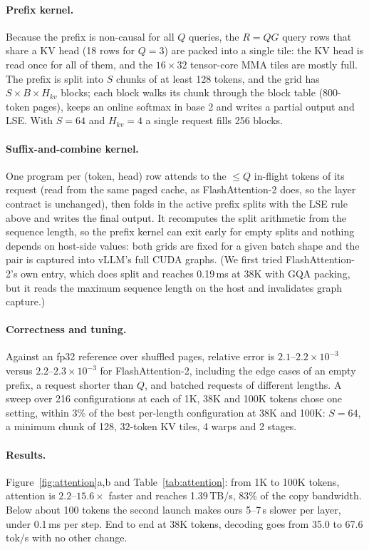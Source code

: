 \documentclass[acmtog,nonacm,screen]{acmart}
\newcommand{\tps}{\,tok/s\xspace}
\newcommand{\us}{\,\textmu{}s\xspace}
\newcommand{\ms}{\,ms\xspace}
\begin{document}
\paragraph{Prefix kernel.} Because the prefix is non-causal for all $Q$ queries, the $R{=}QG$ query rows that share a
KV head (18 rows for $Q{=}3$) are packed into a single tile: the KV head is read once for all of them, and the
$16 \times 32$ tensor-core MMA tiles are mostly full. The prefix is split into $S$ chunks of at least 128 tokens, and
the grid has $S \times B \times H_{kv}$ blocks; each block walks its chunk through the block table (800-token pages),
keeps an online softmax in base 2 and writes a partial output and LSE. With $S{=}64$ and $H_{kv}{=}4$ a single
request fills 256 blocks.

\paragraph{Suffix-and-combine kernel.} One program per (token, head) row attends to the $\le Q$ in-flight tokens of
its request (read from the same paged cache, as FlashAttention-2 does, so the layer contract is unchanged), then folds
in the active prefix splits with the LSE rule above and writes the final output. It recomputes the split arithmetic
from the sequence length, so the prefix kernel can exit early for empty splits and nothing depends on host-side
values: both grids are fixed for a given batch shape and the pair is captured into vLLM's full CUDA graphs. (We first
tried FlashAttention-2's own  entry, which does split and reaches 0.19\ms at 38K with GQA packing,
but it reads the maximum sequence length on the host and invalidates graph capture.)

\paragraph{Correctness and tuning.} Against an fp32 reference over shuffled pages, relative error is
$2.1$--$2.2\times10^{-3}$ versus $2.2$--$2.3\times10^{-3}$ for FlashAttention-2, including the edge cases of an empty
prefix, a request shorter than $Q$, and batched requests of different lengths. A sweep over 216 configurations at each of
1K, 38K and 100K tokens chose one setting, within 3\% of the best per-length configuration at 38K and 100K:
$S{=}64$, a minimum chunk of 128, $32$-token KV tiles, 4 warps and 2 stages.

\paragraph{Results.} Figure~\ref{fig:attention}a,b and Table~\ref{tab:attention}: from 1K to 100K tokens, attention
is $2.2$--$15.6\times$ faster and reaches 1.39\,TB/s, 83\% of the copy bandwidth. Below about 100 tokens the second
launch makes ours 5--7\us slower per layer, under 0.1\ms per step. End to end at 38K tokens, decoding goes from 35.0 to
67.6\tps with no other change.
\end{document}
